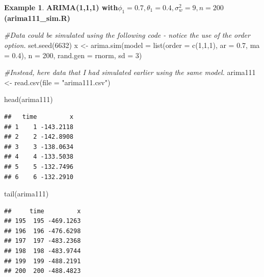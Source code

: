 \documentclass[
]{book}
\newenvironment{Shaded}{\begin{snugshade}}{\end{snugshade}}
\newcommand{\AttributeTok}[1]{\textcolor[rgb]{0.77,0.63,0.00}{#1}}
\newcommand{\CommentTok}[1]{\textcolor[rgb]{0.56,0.35,0.01}{\textit{#1}}}
\newcommand{\DecValTok}[1]{\textcolor[rgb]{0.00,0.00,0.81}{#1}}
\newcommand{\FloatTok}[1]{\textcolor[rgb]{0.00,0.00,0.81}{#1}}
\newcommand{\FunctionTok}[1]{\textcolor[rgb]{0.00,0.00,0.00}{#1}}
\newcommand{\NormalTok}[1]{#1}
\newcommand{\OtherTok}[1]{\textcolor[rgb]{0.56,0.35,0.01}{#1}}
\newcommand{\StringTok}[1]{\textcolor[rgb]{0.31,0.60,0.02}{#1}}
\theoremstyle{definition}
\theoremstyle{definition}
\newtheorem{example}{Example}[chapter]
\theoremstyle{definition}
\theoremstyle{definition}
\theoremstyle{remark}
\begin{document}
\begin{example}

\textbf{ARIMA(1,1,1) with\(\phi_1=0.7, \theta_1=0.4, \sigma_w^2=9, n=200\) (arima111\_sim.R)}

\begin{Shaded}
\begin{Highlighting}[]
\CommentTok{\#Data could be simulated using the following code {-} notice the use of the order option.  }
\FunctionTok{set.seed}\NormalTok{(}\DecValTok{6632}\NormalTok{)}
\NormalTok{x }\OtherTok{\textless{}{-}} \FunctionTok{arima.sim}\NormalTok{(}\AttributeTok{model =} \FunctionTok{list}\NormalTok{(}\AttributeTok{order =} \FunctionTok{c}\NormalTok{(}\DecValTok{1}\NormalTok{,}\DecValTok{1}\NormalTok{,}\DecValTok{1}\NormalTok{), }\AttributeTok{ar =} \FloatTok{0.7}\NormalTok{, }\AttributeTok{ma =} \FloatTok{0.4}\NormalTok{), }\AttributeTok{n =} \DecValTok{200}\NormalTok{, }\AttributeTok{rand.gen =}\NormalTok{ rnorm, }\AttributeTok{sd =} \DecValTok{3}\NormalTok{)}
\end{Highlighting}
\end{Shaded}

\begin{Shaded}
\begin{Highlighting}[]
\CommentTok{\#Instead, here data that I had simulated earlier using the same model.  }
\NormalTok{  arima111 }\OtherTok{\textless{}{-}} \FunctionTok{read.csv}\NormalTok{(}\AttributeTok{file =} \StringTok{"arima111.csv"}\NormalTok{)}

  \FunctionTok{head}\NormalTok{(arima111)}
\end{Highlighting}
\end{Shaded}

\begin{verbatim}
##   time         x
## 1    1 -143.2118
## 2    2 -142.8908
## 3    3 -138.0634
## 4    4 -133.5038
## 5    5 -132.7496
## 6    6 -132.2910
\end{verbatim}

\begin{Shaded}
\begin{Highlighting}[]
  \FunctionTok{tail}\NormalTok{(arima111)}
\end{Highlighting}
\end{Shaded}

\begin{verbatim}
##     time         x
## 195  195 -469.1263
## 196  196 -476.6298
## 197  197 -483.2368
## 198  198 -483.9744
## 199  199 -488.2191
## 200  200 -488.4823
\end{verbatim}


\end{example}
\end{document}
